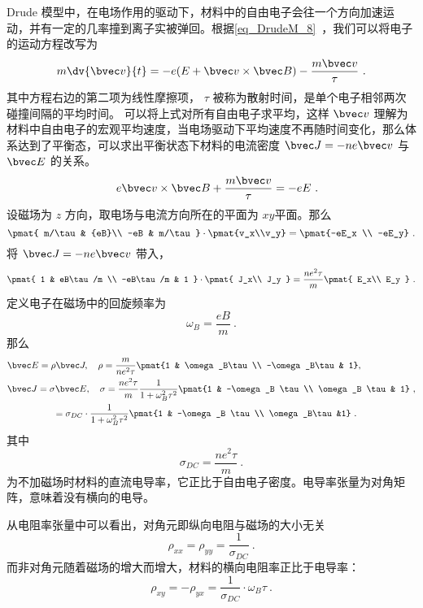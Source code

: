 Drude 模型中，在电场作用的驱动下，材料中的自由电子会往一个方向加速运动，并有一定的几率撞到离子实被弹回。根据\autoref{eq_DrudeM_8}~，我们可以将电子的运动方程改写为
\begin{equation}
m\dv{\bvec v}{t} =  -e(E+\bvec v\times \bvec B)-\frac{m\bvec v}{\tau} ~.
\end{equation}
其中方程右边的第二项为线性摩擦项， $\tau$ 被称为散射时间，是单个电子相邻两次碰撞间隔的平均时间。
可以将上式对所有自由电子求平均，这样 $\bvec v$ 理解为材料中自由电子的宏观平均速度，当电场驱动下平均速度不再随时间变化，那么体系达到了平衡态，可以求出平衡状态下材料的电流密度 $\bvec J=-ne\bvec v$ 与 $\bvec E$ 的关系。
\begin{equation}
\quad e\bvec v\times \bvec B + \frac{m\bvec v}{\tau} = -eE~.
\end{equation}
设磁场为 $z$ 方向，取电场与电流方向所在的平面为 $xy$平面。那么
\begin{equation}
\pmat{
m/\tau  & {eB}\\
-eB & m/\tau
} 
\cdot 
\pmat{v_x\\v_y}=\pmat{-eE_x \\ -eE_y}
~.
\end{equation}
将 $\bvec J=-ne\bvec v$ 带入，
\begin{equation}
\pmat{
    1 & eB\tau/m \\
    -eB\tau/m & 1
}
\cdot 
\pmat{
   J_x\\
   J_y 
}=
\frac{ne^2 \tau}{m }
\pmat{
    E_x\\
    E_y
}
~.
\end{equation}
定义电子在磁场中的回旋频率为
\begin{equation}
\omega_B=\frac{eB}{m}~.
\end{equation}
那么
\begin{equation}
\begin{aligned}
&\bvec E=\rho \bvec J,\quad \rho=\frac{m}{ne^2\tau} \pmat{1 & \omega_B\tau \\ -\omega_B\tau & 1},
\\
&\bvec J=\sigma \bvec E,\quad \sigma =\frac{ne^2\tau}{m} \frac{1}{1+\omega_B^2\tau^2}\pmat{1 & -\omega_B \tau \\ \omega_B \tau & 1} ~,\\
&\qquad \qquad\quad =\sigma_{DC} \cdot  \frac{1}{1+\omega_B^2\tau^2}\pmat{1 & -\omega_B \tau \\ \omega_B\tau &1} ~.
\end{aligned}
\end{equation}
其中
\begin{equation}
\sigma_{DC} = \frac{ne^2\tau}{m}~.
\end{equation}
为不加磁场时材料的直流电导率，它正比于自由电子密度。电导率张量为对角矩阵，意味着没有横向的电导。

从电阻率张量中可以看出，对角元即纵向电阻与磁场的大小无关
\begin{equation}
\rho_{xx}=\rho_{yy}=\frac{1}{\sigma_{DC}} ~.
\end{equation}
而非对角元随着磁场的增大而增大，材料的横向电阻率正比于电导率：
\begin{equation}
\rho_{xy}=-\rho_{yx} = \frac{1}{\sigma_{DC}}\cdot \omega_B\tau~.
\end{equation}


